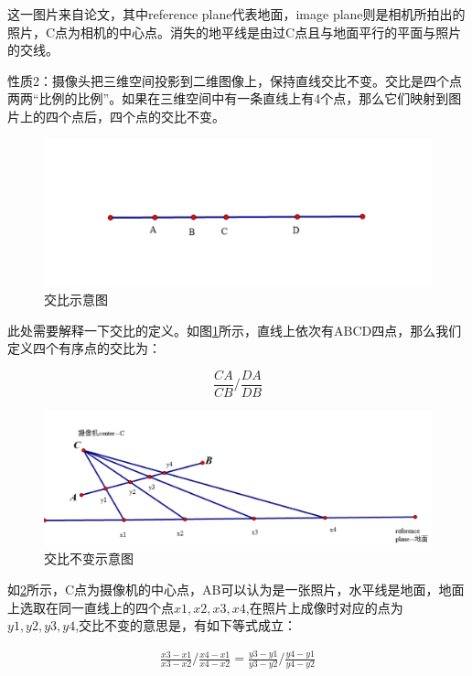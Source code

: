 这一图片来自论文\cite{2000Single}，其中reference plane代表地面，image plane则是相机所拍出的照片，C点为相机的中心点。消失的地平线是由过C点且与地面平行的平面与照片的交线。

性质2：摄像头把三维空间投影到二维图像上，保持直线交比不变。交比是四个点两两“比例的比例”。如果在三维空间中有一条直线上有4个点，那么它们映射到图片上的四个点后，四个点的交比不变。

\begin{figure}[h]
    \centering
    \includegraphics[scale=0.5]{figures/交比示意.png}
    \caption{交比示意图}
    \label{fig:p7}
\end{figure}
此处需要解释一下交比的定义。如图\ref{fig:p7}所示，直线上依次有ABCD四点，那么我们定义四个有序点的交比为：

\begin{equation}
    \frac{CA}{CB}/\frac{DA}{DB}
\end{equation}

\begin{figure}[H]
    \centering
    \includegraphics[scale=0.5]{figures/交比不变示意图.png}
    \caption{交比不变示意图}
    \label{fig:p8}
\end{figure}
如\ref{fig:p8}所示，C点为摄像机的中心点，AB可以认为是一张照片，水平线是地面，地面上选取在同一直线上的四个点$x1,x2,x3,x4$,在照片上成像时对应的点为$y1,y2,y3,y4$,交比不变的意思是，有如下等式成立：

\begin{equation}
    \begin{aligned}
        \frac{x3-x1}{x3-x2}/\frac{x4-x1}{x4-x2}=\frac{y3-y1}{y3-y2}/\frac{y4-y1}{y4-y2}
    \end{aligned}
\end{equation}

